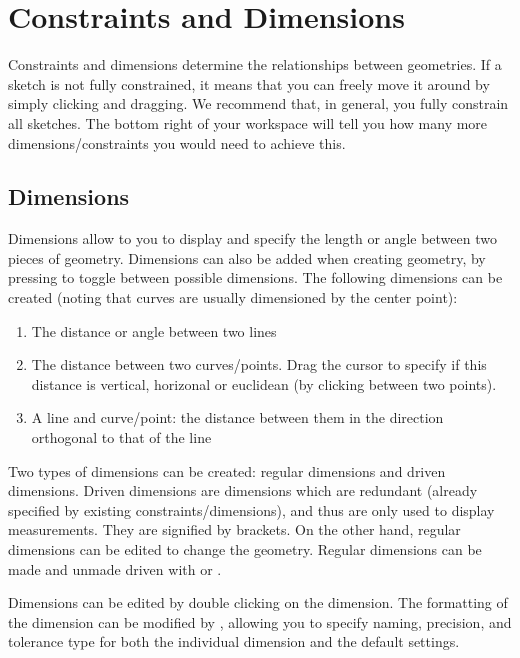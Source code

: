 \section{Constraints and Dimensions}
\label{chap:constraints}

\cbstart
{}
Constraints and dimensions determine the relationships between geometries. If a sketch is not fully constrained, it means that you can freely move it around by simply clicking and dragging. We recommend that, in general, you fully constrain all sketches. The bottom right of your workspace will tell you how many more dimensions/constraints you would need to achieve this.

\cbend

\subsection{Dimensions}
\cbstart
Dimensions allow to you to display and specify the length or angle between two pieces of geometry. Dimensions can also be added when creating geometry, by pressing  to toggle between possible dimensions. The following dimensions can be created (noting that curves are usually dimensioned by the center point):

\begin{enumerate}
\item The distance or angle between two lines
\item The distance between two curves/points. Drag the cursor to specify if this distance is vertical, horizonal or euclidean (by clicking between two points).
\item A line and curve/point: the distance between them in the direction orthogonal to that of the line
\end{enumerate}

Two types of dimensions can be created: regular dimensions and driven dimensions. Driven dimensions are dimensions which are redundant (already specified by existing constraints/dimensions), and thus are only used to display measurements. They are signified by brackets. On the other hand, regular dimensions can be edited to change the geometry. Regular dimensions can be made and unmade driven with  or .

Dimensions can be edited by double clicking on the dimension. The formatting of the dimension can be modified by , allowing you to specify naming, precision, and tolerance type for both the individual dimension and the default settings.

